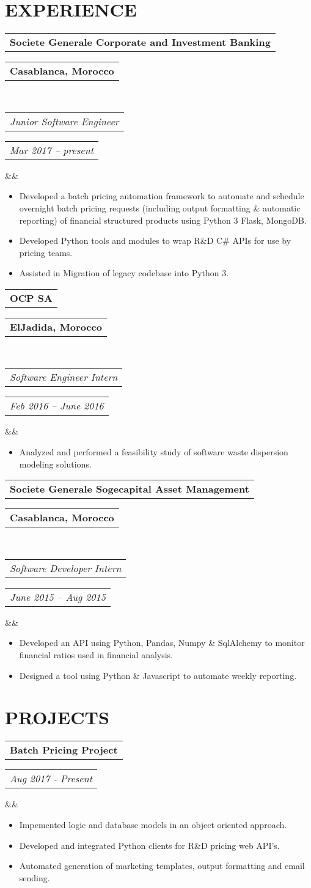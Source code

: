 \documentclass[11pt,a4paper,roman]{moderncv}        %
\makeatletter
\newcommand*{\customcventry}[7][.25em]{
  \begin{tabular}{@{}l} 
    {\bfseries #4}
  \end{tabular}
  \hfill%
  \begin{tabular}{l@{}}
     {\bfseries #5}
  \end{tabular} \\
  \begin{tabular}{@{}l} 
    {\itshape #3}
  \end{tabular}
  \hfill%
  \begin{tabular}{l@{}}
     {\itshape #2}
  \end{tabular}
  \ifx&#7&%
  \else{\\%
    \begin{minipage}{\maincolumnwidth}%
      \small#7%
    \end{minipage}}\fi%
  \par\addvspace{#1}}
\newcommand*{\customcvproject}[4][.25em]{
  \begin{tabular}{@{}l} 
    {\bfseries #2}
  \end{tabular}
  \hfill%
  \begin{tabular}{l@{}}
     {\itshape #3}
  \end{tabular}
  \ifx&#4&%
  \else{\\%
    \begin{minipage}{\maincolumnwidth}%
      \small#4%
    \end{minipage}}\fi%
  \par\addvspace{#1}}
\makeatother
\begin{document}
\section{EXPERIENCE}
%
{\customcventry{Mar 2017 – present}{Junior Software Engineer}{Societe Generale Corporate and Investment Banking}{Casablanca, Morocco}{}{}
{\begin{itemize}
  \item Developed a batch pricing automation framework to automate and schedule overnight batch pricing requests  (including output formatting \& automatic reporting) of financial structured products using Python 3 Flask, MongoDB.
  \item Developed Python tools and modules to wrap R\&D C\# APIs for use  by pricing teams.
  \item Assisted in Migration of legacy codebase into Python 3.
  
\end{itemize}
}

{\customcventry{Feb 2016 – June 2016}{Software Engineer Intern}{OCP SA}{ElJadida, Morocco}{}{}
{\begin{itemize}
  \item Analyzed and performed a feasibility study of software waste dispersion modeling solutions.
  \end{itemize}
}

{\customcventry{June 2015 – Aug 2015}{Software Developer Intern}{Societe Generale  Sogecapital Asset Management}{Casablanca, Morocco}{}{}
{\begin{itemize}
  \item Developed an API using Python, Pandas, Numpy \& SqlAlchemy to monitor financial ratios used in financial analysis.
  \item Designed a tool using Python \& Javascript to automate weekly reporting.
\end{itemize}
}

\section{PROJECTS}

{\customcvproject{Batch Pricing Project}{Aug 2017 - Present}{}{}{}{}{}
  {\begin{itemize}
    \item Impemented logic and database models in an object oriented approach.
    \item Developed and integrated Python clients for R\&D pricing web API's.
    \item Automated generation of marketing templates, output formatting and email sending.


\end{itemize}}}}}}
\end{document}
